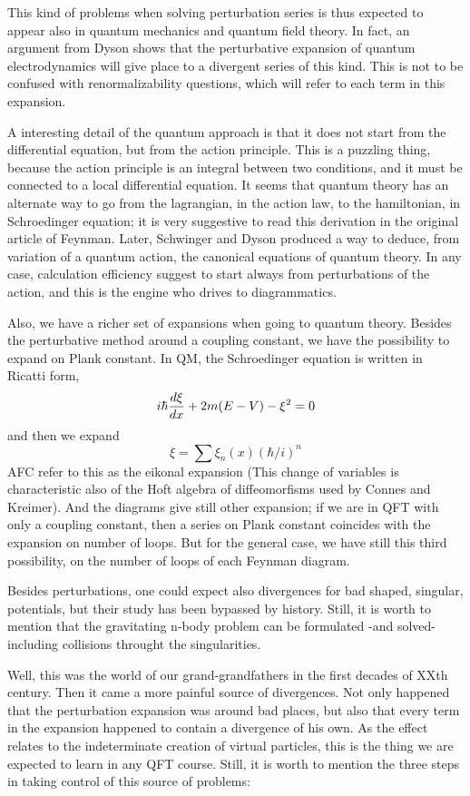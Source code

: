 \documentclass[a4paper,a4paper]{article}
\begin{document}
This kind of problems when solving perturbation series is thus expected to appear 
also in quantum mechanics and quantum field theory. In fact,
an argument from Dyson \cite{dyson} shows that the perturbative expansion of quantum 
electrodynamics will give place to a divergent series of this kind. This is not to be confused 
with renormalizability questions, which will refer to each term in this expansion.

A interesting detail of the quantum approach is that it does not start from the
differential equation, but from the action principle. This is a puzzling thing, because the
action principle is an integral between two conditions, and it must be connected
to a local differential equation. It seems that quantum theory has an alternate
way to go from the lagrangian, in the action law, to the hamiltonian, in 
Schroedinger equation; it is very suggestive to read this derivation in the original 
article of Feynman\cite{feynman}. Later, Schwinger and Dyson produced a way to
deduce, from variation of a quantum action, the canonical equations of quantum theory.
In any case, calculation efficiency suggest to start always from perturbations
of the action, and this is the engine who drives to diagrammatics.

Also, we have a richer set of expansions when going to quantum theory. Besides the 
perturbative method around a coupling constant, we have the possibility to expand on Plank 
constant. In QM, the Schroedinger equation is written in Ricatti form,
$$i \hbar {d\xi \over dx} + 2 m (E-V) - \xi^2 =0 $$
and then we expand
$$\xi = \sum \xi_n(x)  (\hbar / i)^n$$
AFC \cite{AFC} refer to this as the eikonal expansion (This change of variables is 
characteristic also of the Hoft algebra of diffeomorfisms used by Connes and Kreimer).
And the diagrams give still other expansion; if we are in QFT with only a coupling constant,
then a series on Plank constant 
coincides with the expansion on number of loops. But for the general case, we have still this 
third possibility, on the number of loops of each Feynman diagram.

Besides perturbations, one could expect also divergences for bad shaped, singular, 
potentials, but their study has 
been bypassed by history. Still, it is worth to mention that the gravitating n-body problem 
can be formulated -and solved- including collisions throught the singularities. 

Well, this was the world of our grand-grandfathers in the first decades of XXth century. 
Then it came a more painful source of divergences. Not only happened that the perturbation 
expansion was around bad places, but also that every term in the expansion happened to 
contain a divergence of his own. As the effect relates to the indeterminate creation of 
virtual particles, this is the thing we are expected to learn in any QFT course. Still, it is 
worth to mention the three steps in taking control of this source of problems:
\end{document}
